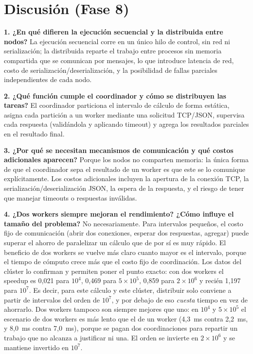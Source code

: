 \documentclass[11pt]{article}
\begin{document}
\section{Discusión (Fase 8)}

\textbf{1. ¿En qué difieren la ejecución secuencial y la distribuida entre nodos?}
La ejecución secuencial corre en un único hilo de control, sin red ni
serialización; la distribuida reparte el trabajo entre procesos sin memoria
compartida que se comunican por mensajes, lo que introduce latencia de red,
costo de serialización/deserialización, y la posibilidad de fallas
parciales independientes de cada nodo.

\textbf{2. ¿Qué función cumple el coordinador y cómo se distribuyen las tareas?}
El coordinador particiona el intervalo de cálculo de forma estática, asigna
cada partición a un worker mediante una solicitud TCP/JSON, supervisa cada
respuesta (validándola y aplicando timeout) y agrega los resultados
parciales en el resultado final.

\textbf{3. ¿Por qué se necesitan mecanismos de comunicación y qué costos adicionales aparecen?}
Porque los nodos no comparten memoria: la única forma de que el coordinador
sepa el resultado de un worker es que este se lo comunique explícitamente.
Los costos adicionales incluyen la apertura de la conexión TCP, la
serialización/deserialización JSON, la espera de la respuesta, y el riesgo
de tener que manejar timeouts o respuestas inválidas.

\textbf{4. ¿Dos workers siempre mejoran el rendimiento? ¿Cómo influye el tamaño del problema?}
No necesariamente. Para intervalos pequeños, el costo fijo de comunicación
(abrir dos conexiones, esperar dos respuestas, agregar) puede superar el
ahorro de paralelizar un cálculo que de por sí es muy rápido. El beneficio
de dos workers se vuelve más claro cuanto mayor es el intervalo, porque el
tiempo de cómputo crece más que el costo fijo de coordinación.
Los datos del clúster lo confirman y permiten poner el punto exacto: con dos
workers el speedup es 0,021 para $10^4$, 0,469 para $5\times10^5$, 0,859 para
$2\times10^6$ y recién 1,197 para $10^7$. Es decir, para este cálculo y este
clúster, distribuir solo conviene a partir de intervalos del orden de $10^7$, y
por debajo de eso \emph{cuesta} tiempo en vez de ahorrarlo. Dos workers tampoco
son siempre mejores que uno: en $10^4$ y $5\times10^5$ el escenario de dos
workers es más lento que el de un worker (4,3~ms contra 2,2~ms, y 8,0~ms contra
7,0~ms), porque se pagan dos coordinaciones para repartir un trabajo que no
alcanza a justificar ni una. El orden se invierte en $2\times10^6$ y se
mantiene invertido en $10^7$.
\end{document}
